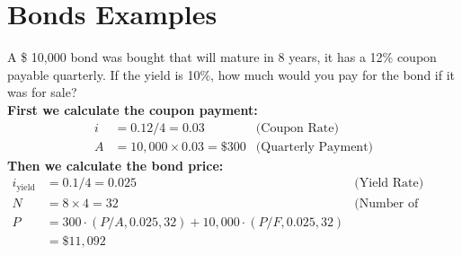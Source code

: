 \section{Bonds Examples}


\begin{example}
    A \$ 10,000 bond was bought that will mature in 8 years, it has a 12\% coupon payable quarterly. If the yield is 10\%, how much would you pay for the bond if it was for sale? \\
    \textbf{First we calculate the coupon payment:}
    \begin{align*}
        i &= 0.12/4 = 0.03 \quad &\text{(Coupon Rate)}\\
        A &= 10,000 \times 0.03 = \$ 300 &\text{(Quarterly Payment)}
    \end{align*}
    \textbf{Then we calculate the bond price:}
    \begin{align*}
        i_{\text{yield}} &= 0.1/4 = 0.025 \quad &\text{(Yield Rate)}\\
        N &= 8\times 4 = 32 \quad &\text{(Number of Payments)}\\
        P &= 300\cdot (P/A, 0.025, 32) + 10,000\cdot (P/F, 0.025, 32)\\
        &= \$ 11,092
    \end{align*}
\end{example}

